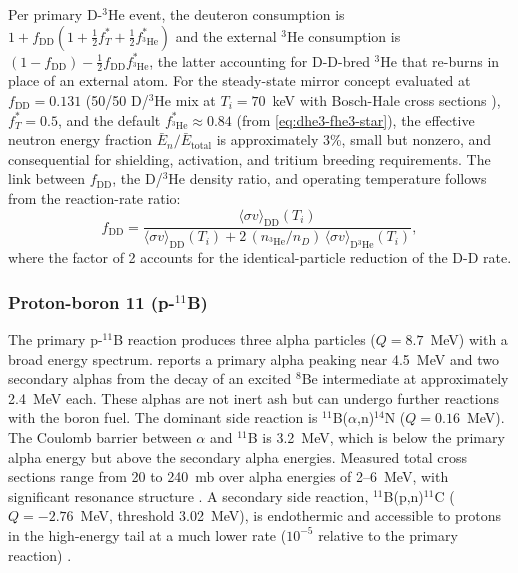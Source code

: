 \documentclass{article}
\begin{document}
Per primary D-${}^3$He event, the deuteron
consumption is $1 + f_{\text{DD}} (1 + \tfrac{1}{2} f_T^*
+ \tfrac{1}{2} f_{{}^3\text{He}}^*)$ and the
external ${}^3$He consumption is $(1 - f_{\text{DD}})
- \tfrac{1}{2} f_{\text{DD}} f_{{}^3\text{He}}^*$,
the latter accounting for D-D-bred ${}^3$He that re-burns in place
of an external atom.
For the steady-state mirror concept evaluated at $f_{\text{DD}} =
0.131$ (50/50 D/${}^3$He mix at $T_i = 70$~keV with Bosch-Hale cross
sections \citep{boschhale1992}), $f_T^* = 0.5$, and the default
$f_{{}^3\text{He}}^* \approx 0.84$ (from \cref{eq:dhe3-fhe3-star}),
the effective neutron energy fraction $\bar{E}_n / \bar{E}_{\text{total}}$
is approximately 3\%, small but nonzero, and consequential for
shielding, activation, and tritium breeding requirements. The link between $f_{\text{DD}}$, the
D/${}^3$He density ratio, and operating temperature follows from the
reaction-rate ratio:
\begin{equation}
\label{eq:dhe3-fdd}
f_{\text{DD}} = \frac{\langle\sigma v\rangle_{\text{DD}}(T_i)}
  {\langle\sigma v\rangle_{\text{DD}}(T_i)
   + 2\,(n_{{}^3\text{He}}/n_D)\,\langle\sigma v\rangle_{\text{D}{}^3\text{He}}(T_i)},
\end{equation}
where the factor of 2 accounts for the identical-particle reduction of
the D-D rate.

\subsubsection{\texorpdfstring{Proton-boron 11 (p-${}^{11}$B)}{Proton-boron 11 (p-11B)}}
The primary p-${}^{11}$B reaction produces three alpha particles
($Q = 8.7$~MeV) with a broad energy spectrum. \citet{dmitriev2009} reports
a primary alpha peaking near 4.5~MeV and two secondary alphas from the
decay of an excited ${}^8$Be intermediate at approximately 2.4~MeV each. These alphas
are not inert ash but can undergo further reactions with the boron fuel.
The dominant side reaction is ${}^{11}$B($\alpha$,n)${}^{14}$N ($Q = 0.16$~MeV).
The Coulomb barrier between $\alpha$ and ${}^{11}$B is 3.2~MeV, which is
below the primary alpha energy but above the secondary alpha energies.
Measured total cross sections range from 20 to 240~mb
over alpha energies of 2--6~MeV, with significant resonance structure
\citep{prior2017}. A secondary side reaction,
${}^{11}$B(p,n)${}^{11}$C ($Q = -2.76$~MeV, threshold 3.02~MeV),
is endothermic and accessible to protons in the high-energy tail at a much lower rate
($10^{-5}$ relative to the primary reaction)
\citep{putvinski2019}.
\end{document}
